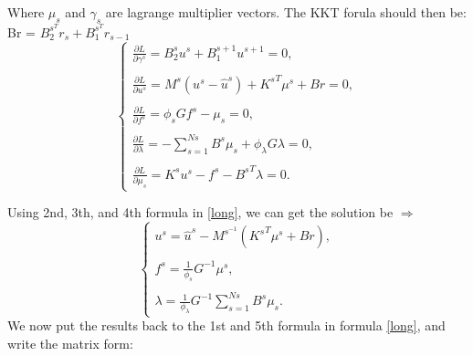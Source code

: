 \documentclass{article}
\begin{document}
    Where $\mu_s$ and $\gamma_s$ are lagrange multiplier vectors. The KKT forula should then be:
    Br = $B_2^{s^{T}} r_s + B_1^{s^{T}} r_{s-1}$\\
    \begin{equation}
        \begin{cases}
    \frac{\partial L}{\partial \gamma^s} = B^s_2 u^s + B^{s+1}_1 u^{s+1} = 0,\\
    \\
    \frac{\partial L}{\partial u^s} = M^s (u^s - \hat{u}^s) + {K^s}^T \mu^s + Br = 0,\\
    \\
    \frac{\partial L}{\partial f^s} = \phi_s G f^s - \mu_s = 0,\\
    \\
    \frac{\partial L}{\partial \lambda} = -\sum_{s=1}^{Ns} B^s \mu_s + \phi_\lambda G \lambda = 0,\\
    \\
    \frac{\partial L}{\partial \mu_s} = K^s u^s - f^s - {B^s}^T \lambda = 0.
    \label{long}
\end{cases}
\end{equation}

Using 2nd, 3th, and 4th formula in \ref{long}, we can get the solution be
$\Rightarrow $
    \\\begin{equation}
        \begin{cases}
        u^s = \hat{u}^s-M^{s^{-1}}({K^s}^T \mu^s + Br),\\
    \\
        f^s = \frac{1}{\phi_s}G^{-1}\mu^s,\\
    \\
        \lambda = \frac{1}{\phi_\lambda}G^{-1}\sum_{s=1}^{Ns} B^s \mu_s.
        \end{cases}
        \label{short}
 \end{equation}
 We now put the results back to the 1st and 5th formula in formula \ref{long}, and write the matrix form:
\end{document}
